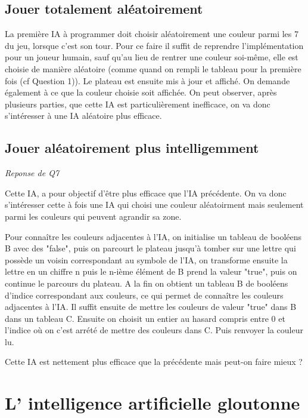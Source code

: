 \documentclass[a4paper,11pt]{article}
\begin{document}
\subsection{Jouer totalement aléatoirement}

La première IA à programmer doit choisir aléatoirement une couleur parmi 
les 7 du jeu, lorsque c'est son tour. Pour ce faire il suffit de reprendre 
l'implémentation pour un joueur humain, sauf qu'au lieu de rentrer une couleur
soi-même, elle est choisie de manière aléatoire (comme quand on rempli le tableau
pour la première fois (cf Question 1)). Le plateau est ensuite mis à jour 
et affiché. On demande également à ce que la couleur choisie soit affichée.
On peut observer, après plusieurs parties, que cette IA est particulièrement 
inefficace, on va donc s'intéresser à une IA aléatoire plus efficace.


\subsection{Jouer aléatoirement plus intelligemment}
\emph{Reponse de Q7}

Cette IA, a pour objectif d'être plus efficace que l'IA précédente. On va donc
s'intéresser cette à fois une IA qui choisi une couleur aléatoirment mais 
seulement parmi les couleurs qui peuvent agrandir sa zone. 

Pour connaître les couleurs adjacentes à l'IA, on initialise un tableau de
booléens B avec des "false", puis on parcourt le plateau jusqu'à tomber sur une lettre qui possède 
un voisin correspondant au symbole de l'IA, on transforme ensuite la lettre 
en un chiffre n puis le n-ième élément de B prend la valeur "true", puis on continue
le parcours du plateau. A la fin on obtient un tableau B de booléens d'indice correspondant aux couleurs, ce qui permet de connaître
les couleurs adjacentes à l'IA. Il suffit ensuite de mettre les couleurs de valeur "true" dans B dans un tableau C. Ensuite on choisit un entier au hasard compris entre 0 et l'indice où on c'est arrété de mettre des couleurs dans C. Puis renvoyer la couleur lu.

Cette IA est nettement plus efficace que la précédente mais peut-on faire mieux ?


\section{L' intelligence artificielle gloutonne}
\end{document}
